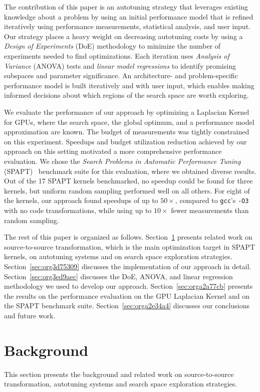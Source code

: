 \documentclass[conference]{IEEEtran}
\begin{document}
The contribution of this paper is an autotuning strategy that leverages existing
knowledge about a problem by using an initial performance model that is refined
iteratively using performance measurements, statistical analysis, and user
input. Our strategy places a heavy weight on decreasing autotuning costs by
using a \emph{Design of Experiments} (DoE) methodology to minimize the number of
experiments needed to find optimizations. Each iteration uses \emph{Analysis of
Variance} (ANOVA) tests and \emph{linear model regressions} to identify promising
subspaces and parameter significance. An architecture- and problem-specific
performance model is built iteratively and with user input, which enables making
informed decisions about which regions of the search space are worth exploring.

We evaluate the performance of our approach by optimizing a Laplacian Kernel for
GPUs, where the search space, the global optimum, and a performance model
approximation are known. The budget of measurements was tightly constrained on
this experiment. Speedups and budget utilization reduction achieved by our
approach on this setting motivated a more comprehensive performance evaluation.
We chose the \emph{Search Problems in Automatic Performance Tuning}
(SPAPT)~\cite{balaprakash2012spapt} benchmark suite for this evaluation,
where we obtained diverse results. Out of the 17 SPAPT kernels benchmarked, no
speedup could be found for three kernels, but uniform random sampling performed
well on all others. For eight of the kernels, our approach found speedups of up
to \(50\times\), compared to \texttt{gcc}'s \texttt{-O3} with no code transformations, while
using up to \(10\times\) fewer measurements than random sampling.

The rest of this paper is organized as follows. Section~\ref{sec:org25e77d4}
presents related work on source-to-source transformation, which is the main
optimization target in SPAPT kernels, on autotuning systems and on search space
exploration strategies. Section~\ref{sec:org3d75309}
discusses the implementation of our approach in detail. Section~\ref{sec:org3ed9aec} discusses the DoE, ANOVA, and linear regression methodology we used
to develop our approach. Section~\ref{sec:orga2a77cb} presents the
results on the performance evaluation on the GPU Laplacian Kernel and on the
SPAPT benchmark suite. Section~\ref{sec:orga2e34a4} discusses our conclusions and
future work.
\section{Background}
\label{sec:org25e77d4}
This section presents the background and related work on source-to-source
transformation, autotuning systems and search space exploration strategies.
\end{document}
